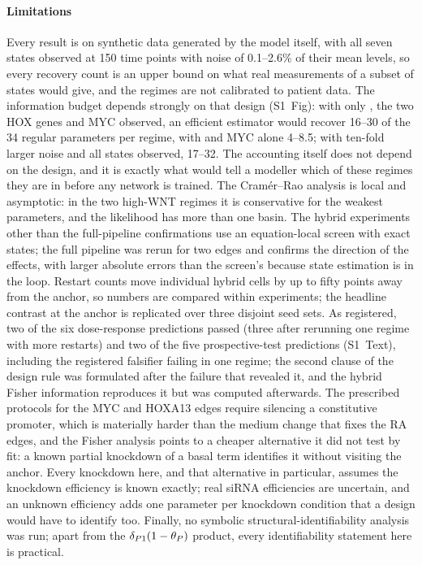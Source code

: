\paragraph{Limitations} Every result is on synthetic data generated by the model
itself, with all seven states observed at 150 time points with noise of 0.1--2.6\% of their mean levels, so
every recovery count is an upper bound on what real measurements of a subset of
states would give, and the regimes are not calibrated to patient data. The
information budget depends strongly on that design (S1~Fig): with only
\bcat{}, the two HOX genes and MYC observed, an efficient estimator would
recover 16--30 of the 34 regular parameters per regime, with \bcat{} and MYC
alone 4--8.5; with ten-fold larger noise and all states observed, 17--32. The accounting itself does
not depend on the design, and it is exactly what would tell a modeller which of
these regimes they are in before any network is trained. The
Cram\'er--Rao analysis is local and asymptotic: in the two high-WNT regimes it
is conservative for the weakest parameters, and the likelihood has more than one
basin. The hybrid experiments other than the full-pipeline
confirmations use an equation-local screen with exact states; the full pipeline
was rerun for two edges and confirms the direction of the effects, with larger
absolute errors than the screen's because state estimation is in the loop. Restart counts move individual hybrid cells by up to fifty points
away from the anchor, so numbers are compared within experiments; the headline
contrast at the anchor is replicated over three disjoint seed sets. As registered, two of the six dose-response
predictions passed (three after rerunning one regime with more restarts) and two
of the five prospective-test predictions (S1~Text), including the registered
falsifier failing in one regime; the second clause of the design rule was
formulated after the failure that revealed it, and the hybrid Fisher information reproduces it but
was computed afterwards. The prescribed protocols for the MYC and HOXA13 edges
require silencing a constitutive promoter, which is materially harder than the
medium change that fixes the RA edges, and the Fisher analysis points to a
cheaper alternative it did not test by fit: a known partial knockdown of a basal
term identifies it without visiting the anchor. Every knockdown here, and that
alternative in particular, assumes the knockdown efficiency is known exactly;
real siRNA efficiencies are uncertain, and an unknown efficiency adds one
parameter per knockdown condition that a design would have to identify too. Finally, no symbolic
structural-identifiability analysis~\citep{villaverde2016structural,chis2011structural}
was run; apart from the $\delta_{P1}(1-\theta_P)$ product, every identifiability statement
here is practical.

